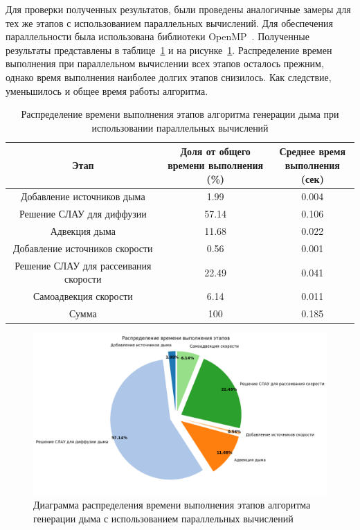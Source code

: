 Для проверки полученных результатов, были проведены аналогичные замеры для тех же этапов с использованием параллельных вычислений. Для обеспечения параллельности была использована библиотеки OpenMP~\cite{OpenMP}. Полученные результаты представлены в таблице~\ref{tab:parallel} и на рисунке~\ref{fig:parallel}. Распределение времен выполнения при параллельном вычислении всех этапов осталось прежним, однако время выполнения наиболее долгих этапов снизилось. Как следствие, уменьшилось и общее время работы алгоритма.

\begin{table}[H]
	\caption{Распределение времени выполнения этапов алгоритма генерации дыма при использовании параллельных вычислений}
	\label{tab:parallel}
	\centering
	\begin{tabular}{|c|c|c|}
		\hline
		Этап&\shortstack{Доля от общего\\времени выполнения (\%)}&\shortstack{Среднее время\\ выполнения (сек)}\\\hline
		Добавление источников дыма&1.99&0.004\\\hline
		Решение СЛАУ для диффузии &57.14&0.106\\\hline
		Адвекция дыма&11.68&0.022\\\hline
		Добавление источников скорости&0.56&0.001\\\hline
		Решение СЛАУ для рассеивания скорости&22.49&0.041\\\hline
		Самоадвекция скорости&6.14&0.011\\\hline\hline
		Сумма&100&	0.185\\\hline
	\end{tabular}
\end{table}

\begin{figure}[H]
	\centering
	\includegraphics[width=1.0\textwidth,page=1]{assets/img/pie_parallel.png}
	\caption{Диаграмма распределения времени выполнения этапов алгоритма генерации дыма с использованием параллельных вычислений}
	\label{fig:parallel}
\end{figure}


